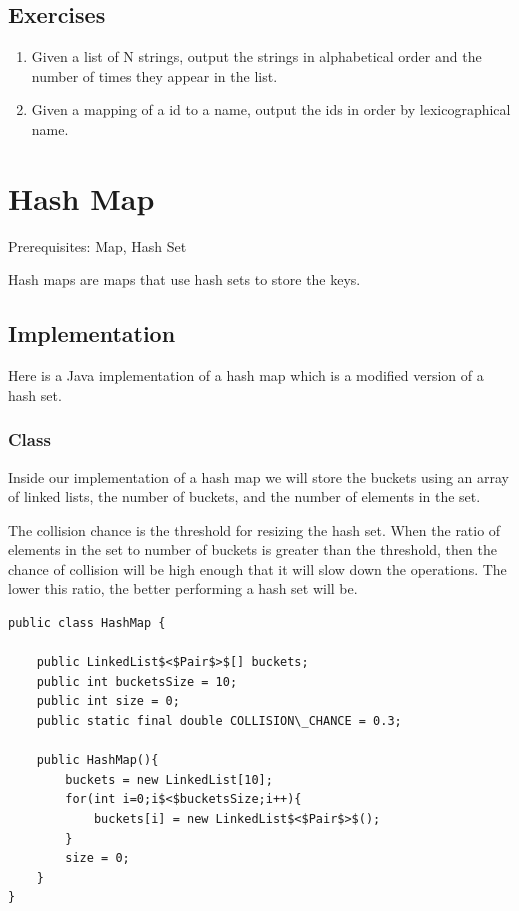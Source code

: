 \documentclass[11pt,oneside]{book}
\begin{document}
\subsection{Exercises}

\begin{enumerate}
\item Given a list of N strings, output the strings in alphabetical order and the number of times they appear in the list.
\item Given a mapping of a id to a name, output the ids in order by lexicographical name.
\end{enumerate}

        \section{ Hash Map }
        

Prerequisites: Map, Hash Set



Hash maps are maps that use hash sets to store the keys.

\subsection{Implementation}

Here is a Java implementation of a hash map which is a modified version of a hash set.

\subsubsection{Class}

Inside our implementation of a hash map we will store the buckets using an array of linked lists, the number of buckets, and the number of elements in the set.

The collision chance is the threshold for resizing the hash set. When the ratio of elements in the set to number of buckets is greater than the threshold, then the chance of collision will be high enough that it will slow down the operations. The lower this ratio, the better performing a hash set will be.

\begin{lstlisting}
public class HashMap {

    public LinkedList$<$Pair$>$[] buckets;
    public int bucketsSize = 10;
    public int size = 0;
    public static final double COLLISION\_CHANCE = 0.3;
    
    public HashMap(){
        buckets = new LinkedList[10];
        for(int i=0;i$<$bucketsSize;i++){
            buckets[i] = new LinkedList$<$Pair$>$();
        }
        size = 0;
    }
}
\end{lstlisting}
\end{document}
